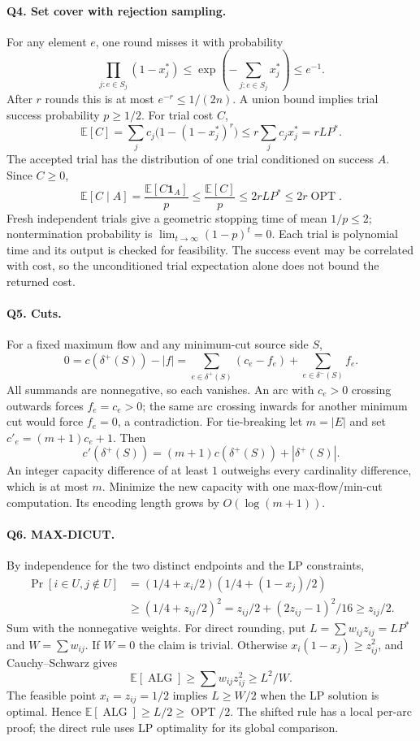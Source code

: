 \documentclass[10pt]{article}
\theoremstyle{definition}
\newcommand{\OPT}{\operatorname{OPT}}
\newcommand{\ALG}{\operatorname{ALG}}
\begin{document}
\paragraph{Q4. Set cover with rejection sampling.}
For any element $e$, one round misses it with probability
\[
\prod_{j:e\in S_j}(1-x_j^*)
\le \exp\!\left(-\sum_{j:e\in S_j}x_j^*\right)\le e^{-1}.
\]
After $r$ rounds this is at most $e^{-r}\le1/(2n)$.  A union bound implies
trial success probability $p\ge1/2$.  For trial cost $C$,
\[
\mathbb E[C]=\sum_j c_j\bigl(1-(1-x_j^*)^r\bigr)
\le r\sum_j c_jx_j^*=rLP^*.
\]
The accepted trial has the distribution of one trial conditioned on success
$A$.  Since $C\ge0$,
\[
\mathbb E[C\mid A]
=\frac{\mathbb E[C\mathbf1_A]}p
\le\frac{\mathbb E[C]}p\le2rLP^*\le2r\OPT.
\]
Fresh independent trials give a geometric stopping time of mean $1/p\le2$;
nontermination probability is $\lim_{t\to\infty}(1-p)^t=0$.
Each trial is polynomial time and its output is checked for feasibility.
The success event may be correlated with cost, so the unconditioned trial
expectation alone does not bound the returned cost.

\paragraph{Q5. Cuts.}
For a fixed maximum flow and any minimum-cut source side $S$,
\[
0=c(\delta^+(S))-|f|
=\sum_{e\in\delta^+(S)}(c_e-f_e)
 +\sum_{e\in\delta^-(S)}f_e.
\]
All summands are nonnegative, so each vanishes.  An arc with $c_e>0$
crossing outwards forces $f_e=c_e>0$; the same arc crossing inwards for
another minimum cut would force $f_e=0$, a contradiction.
For tie-breaking let $m=|E|$ and set $c'_e=(m+1)c_e+1$.  Then
\[
c'(\delta^+(S))=(m+1)c(\delta^+(S))+|\delta^+(S)|.
\]
An integer capacity difference of at least $1$ outweighs every cardinality
difference, which is at most $m$.  Minimize the new capacity with one
max-flow/min-cut computation.  Its encoding length grows by $O(\log(m+1))$.

\paragraph{Q6. MAX-DICUT.}
By independence for the two distinct endpoints and the LP constraints,
\begin{align*}
\Pr[i\in U,j\notin U]
&=(1/4+x_i/2)(1/4+(1-x_j)/2)\\
&\ge(1/4+z_{ij}/2)^2
=z_{ij}/2+(2z_{ij}-1)^2/16\ge z_{ij}/2.
\end{align*}
Sum with the nonnegative weights.  For direct rounding, put
$L=\sum w_{ij}z_{ij}=LP^*$ and $W=\sum w_{ij}$.  If $W=0$ the claim is
trivial.  Otherwise $x_i(1-x_j)\ge z_{ij}^2$, and Cauchy--Schwarz gives
\[
\mathbb E[\ALG]\ge\sum w_{ij}z_{ij}^2\ge L^2/W.
\]
The feasible point $x_i=z_{ij}=1/2$ implies $L\ge W/2$ when the LP
solution is optimal.  Hence $\mathbb E[\ALG]\ge L/2\ge\OPT/2$.
The shifted rule has a local per-arc proof; the direct rule uses LP
optimality for its global comparison.
\end{document}
